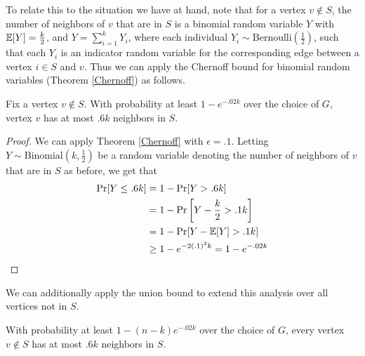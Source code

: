 \documentclass{article}
\begin{document}
To relate this to the situation we have at hand, note that for a vertex $v \notin S$,
the number of neighbors of $v$ that are in $S$ is a binomial random variable $Y$ with
$\operatorname{\mathbb{E}}[Y] = \frac{k}{2}$, and $Y = \sum_{i = 1}^{k} Y_{i}$, where each individual
$Y_{i} \sim \text{Bernoulli}\left(\frac{1}{2}\right)$, such that each $Y_{i}$
is an indicator random variable for the corresponding edge between a vertex $i
\in S$ and $v$. Thus we can apply the Chernoff bound for binomial random
variables (Theorem \ref{Chernoff}) as follows.

\begin{corollary}
    \label{chernoff neighbors}
    Fix a vertex $v \notin S$. With probability at least $1 - e^{-.02k}$ over
    the choice of $G$, vertex $v$ has at most $.6k$ neighbors in $S$.
\end{corollary}

\begin{proof}
    We can apply Theorem \ref{Chernoff} with $\epsilon = .1$. Letting $Y \sim
    \text{Binomial}\left(k, \frac{1}{2}\right)$ be a
    random variable
    denoting the number of neighbors of $v$ that are in $S$ as before, we get that
    \begin{align*}
        \Pr[Y \leq .6k] &= 1 - \Pr[Y > .6k]
        \\
        &= 1 - \Pr\left[Y - \frac{k}{2} > .1k\right]
        \\
        &= 1 - \Pr[Y - \operatorname{\mathbb{E}}[Y] > .1k]
        \\
        &\geq 1 - e^{-2(.1)^{2}k} = 1 - e^{-.02k}
    \end{align*}
\end{proof}

We can additionally apply the union bound to extend this analysis over all vertices not
in $S$.

\begin{corollary}
    With probability at least $1 - (n - k) e^{-.02k}$ over the choice of $G$,
    every vertex $v \notin S$ has at most $.6k$ neighbors in $S$.
\end{corollary}
\end{document}
